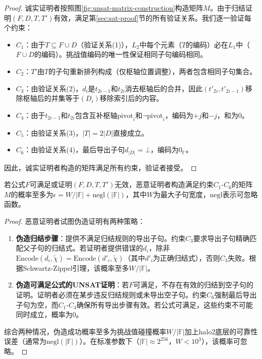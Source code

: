 \begin{proof}
诚实证明者按照图\ref{fig:unsat-matrix-construction}构造矩阵$M$。由于归结证明$(F, D, T, T')$有效，满足第\ref{sec:sat-proof}节的所有验证关系。我们逐一验证每个约束：
\begin{itemize}
    \item $C_1$：由于$T \subseteq F \cup D$（验证关系(1)），$L_2$中每个元素（$T$的编码）必在$L_1$中（$F \cup D$的编码）。挑战值编码的唯一性保证相同子句编码相同。
    \item $C_2$：$T'$由$T$的子句重新排列构成（仅枢轴位置调整），两者包含相同子句集合。
    \item $C_3$：由验证关系(2)，$d_i$是$t_{2i-1}$和$t_{2i}$消去枢轴后的合并，因此$(t'_{2i}, t'_{2i-1})$移除枢轴后的并集等于$(D_i)$移除索引后的内容。
    \item $C_4$：由于$t_{2i-1}$和$t_{2i}$包含互补枢轴$\text{pivot}_i$和$\neg\text{pivot}_i$，编码为$+j$和$-j$，和为0。
    \item $C_5$：由验证关系(3)，$|T| = 2|D|$直接成立。
    \item $C_6$：由验证关系(4)，最后导出子句$d_{|D|} = \bot$，编码为$0_{\mathbb{F}}$。
\end{itemize}
因此，诚实证明者构造的矩阵满足所有约束，验证者接受。
\end{proof}

\begin{theorem}[UNSAT验证的可靠性]
若公式$F$可满足或证明$(F, D, T, T')$无效，恶意证明者构造满足约束$C_1$-$C_6$的矩阵$M$的概率至多为$\epsilon = W/|\mathbb{F}| + \text{negl}(|\mathbb{F}|)$，其中$W$为最大子句宽度，$\text{negl}$表示可忽略函数。
\end{theorem}

\begin{proof}
恶意证明者试图伪造证明有两种策略：
\begin{enumerate}
    \item \textbf{伪造归结步骤}：提供不满足归结规则的导出子句。约束$C_3$要求导出子句精确匹配父子句的归结式。若证明者提供错误的$d_i$，除非$\text{Encode}(d_i, \tilde{\chi}) = \text{Encode}(d'_i, \tilde{\chi})$（其中$d'_i$为正确归结式），否则$C_3$失败。根据Schwartz-Zippel引理，该概率至多$W/|\mathbb{F}|$。
    \item \textbf{伪造可满足公式的UNSAT证明}：若$F$可满足，不存在有效的归结到空子句的证明。证明者必须在某步违反归结规则或未导出空子句。约束$C_6$强制最后导出子句为空，而$C_1$-$C_4$确保所有导出步骤有效。若公式可满足，这些约束不可能同时成立，概率为0。
\end{enumerate}
综合两种情况，伪造成功概率至多为挑战值碰撞概率$W/|\mathbb{F}|$加上halo2底层的可靠性误差（通常为$\text{negl}(|\mathbb{F}|)$）。在标准参数下（$|\mathbb{F}| \approx 2^{256}$，$W < 10^3$），该概率可忽略。
\end{proof}

